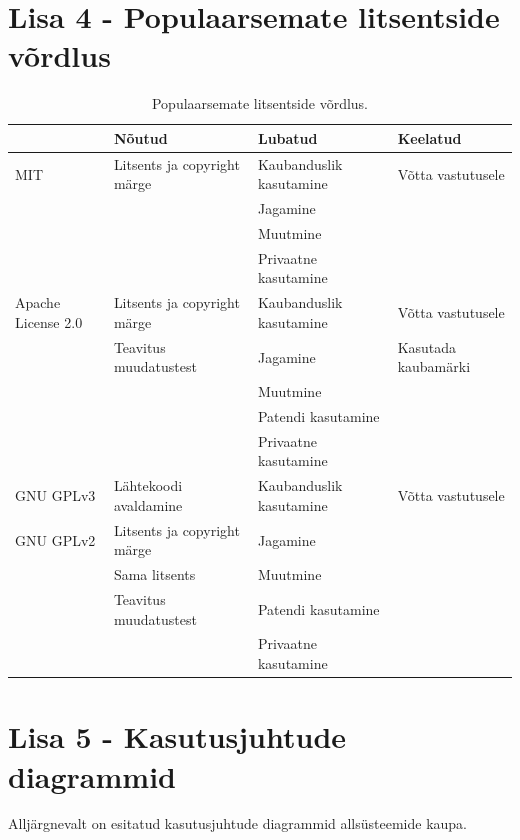\documentclass[a4paper,12pt]{article} %
\begin{document}
\section*{Lisa 4 - Populaarsemate litsentside võrdlus}
\label{lisa1}
\begin{table}[H]
\centering
\caption{Populaarsemate litsentside võrdlus.}
\label{table_litsentside_vordlus}
\begin{tabular}{|p{3cm}|p{4cm}|p{4cm}|p{4cm}|}
\hline
\rowcolor{rowgray}
 & Nõutud & Lubatud & Keelatud \\ \hline
MIT & Litsents ja copyright märge & Kaubanduslik kasutamine & Võtta vastutusele \\
 &  & Jagamine &  \\
 &  & Muutmine &  \\
 &  & Privaatne kasutamine &  \\ \hline
Apache \newline License 2.0 & Litsents ja copyright märge & Kaubanduslik kasutamine & Võtta vastutusele \\
 & Teavitus muudatustest & Jagamine & Kasutada kaubamärki \\
 &  & Muutmine &  \\
 &  & Patendi kasutamine &  \\
 &  & Privaatne kasutamine &  \\ \hline
GNU GPLv3 & Lähtekoodi avaldamine & Kaubanduslik kasutamine & Võtta vastutusele \\
GNU GPLv2 & Litsents ja copyright märge & Jagamine &  \\
 & Sama litsents & Muutmine &  \\
 & Teavitus muudatustest & Patendi kasutamine &  \\
 &  & Privaatne kasutamine & \\ \hline
\end{tabular}
\cite{Licences}
\end{table}
\pagebreak

\section*{Lisa 5 - Kasutusjuhtude diagrammid}
Alljärgnevalt on esitatud kasutusjuhtude diagrammid allsüsteemide kaupa.
\end{document}
